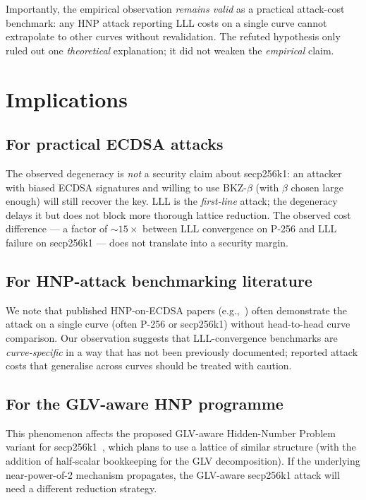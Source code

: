 \documentclass[10pt,a4paper]{article}
\begin{document}
Importantly, the empirical observation \emph{remains valid} as a
practical attack-cost benchmark: any HNP attack reporting LLL costs
on a single curve cannot extrapolate to other curves without
revalidation. The refuted hypothesis only ruled out one
\emph{theoretical} explanation; it did not weaken the
\emph{empirical} claim.

\section{Implications}

\subsection{For practical ECDSA attacks}

The observed degeneracy is \emph{not} a security claim about
secp256k1: an attacker with biased ECDSA signatures and willing
to use BKZ-$\beta$ (with $\beta$ chosen large enough) will still
recover the key. LLL is the \emph{first-line} attack; the
degeneracy delays it but does not block more thorough lattice
reduction. The observed cost difference --- a factor of
$\sim 15\times$ between LLL convergence on P-256 and LLL failure on
secp256k1 --- does not translate into a security margin.

\subsection{For HNP-attack benchmarking literature}

We note that published HNP-on-ECDSA papers
(e.g.,~\cite{nguyen2002, mulder2013, aldaya2020}) often
demonstrate the attack on a single curve (often P-256 or
secp256k1) without head-to-head curve comparison. Our observation
suggests that LLL-convergence benchmarks are \emph{curve-specific}
in a way that has not been previously documented; reported
attack costs that generalise across curves should be treated with
caution.

\subsection{For the GLV-aware HNP programme}

This phenomenon affects the proposed GLV-aware Hidden-Number
Problem variant for secp256k1~\cite[\S 4]{ourcompanionnote}, which
plans to use a lattice of similar structure (with the addition of
half-scalar bookkeeping for the GLV decomposition). If the
underlying near-power-of-2 mechanism propagates, the GLV-aware
secp256k1 attack will need a different reduction strategy.
\end{document}
